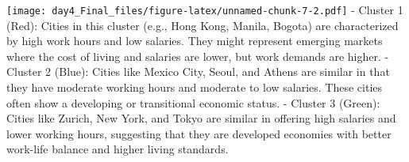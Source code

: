 \documentclass[
]{article}
\newenvironment{Shaded}{\begin{snugshade}}{\end{snugshade}}
\newcommand{\AttributeTok}[1]{\textcolor[rgb]{0.13,0.29,0.53}{#1}}
\newcommand{\CommentTok}[1]{\textcolor[rgb]{0.56,0.35,0.01}{\textit{#1}}}
\newcommand{\DecValTok}[1]{\textcolor[rgb]{0.00,0.00,0.81}{#1}}
\newcommand{\FloatTok}[1]{\textcolor[rgb]{0.00,0.00,0.81}{#1}}
\newcommand{\FunctionTok}[1]{\textcolor[rgb]{0.13,0.29,0.53}{\textbf{#1}}}
\newcommand{\NormalTok}[1]{#1}
\newcommand{\OtherTok}[1]{\textcolor[rgb]{0.56,0.35,0.01}{#1}}
\newcommand{\SpecialCharTok}[1]{\textcolor[rgb]{0.81,0.36,0.00}{\textbf{#1}}}
\newcommand{\StringTok}[1]{\textcolor[rgb]{0.31,0.60,0.02}{#1}}
\begin{document}
\begin{Shaded}
\end{Shaded}

\texttt{[image: day4\_Final\_files/figure-latex/unnamed-chunk-7-2.pdf]} -
Cluster 1 (Red): Cities in this cluster (e.g., Hong Kong, Manila,
Bogota) are characterized by high work hours and low salaries. They
might represent emerging markets where the cost of living and salaries
are lower, but work demands are higher. - Cluster 2 (Blue): Cities like
Mexico City, Seoul, and Athens are similar in that they have moderate
working hours and moderate to low salaries. These cities often show a
developing or transitional economic status. - Cluster 3 (Green): Cities
like Zurich, New York, and Tokyo are similar in offering high salaries
and lower working hours, suggesting that they are developed economies
with better work-life balance and higher living standards.
\end{document}
